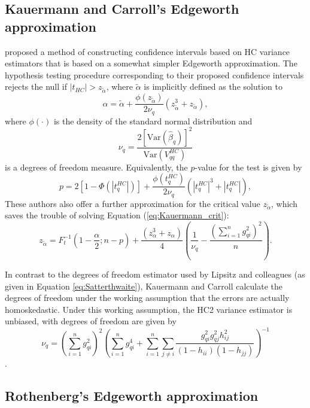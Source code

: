 \documentclass[12pt]{article}\usepackage[]{graphicx}\usepackage[]{color}
\newcommand{\Var}{\text{Var}}
\begin{document}
\subsection{Kauermann and Carroll's Edgeworth approximation}

\citet{Kauermann2001note} proposed a method of constructing confidence intervals based on HC variance estimators that is based on a somewhat simpler Edgeworth approximation. The hypothesis testing procedure corresponding to their proposed confidence intervals rejects the null if $\left|t_{HC} \right| > z_{\tilde\alpha}$, where $\tilde\alpha$ is implicitly defined as the solution to \begin{equation}
\label{eq:Kauermann_crit}
\alpha = \tilde\alpha + \frac{\phi\left(z_{\tilde\alpha}\right)}{2 \nu_q}\left(z_{\tilde\alpha}^3 + z_{\tilde\alpha}\right), 
\end{equation}
where $\phi(\cdot)$ is the density of the standard normal distribution and \[
\nu_q  = \frac{2 \left[\Var(\hat\beta_q)\right]^2}{\Var\left(V^{HC}_{qq}\right)}\] 
is a degrees of freedom measure. Equivalently, the $p$-value for the test is given by \[
p = 2 \left[1 - \Phi\left(|t^{HC}_q|\right)\right] + \frac{\phi\left(t^{HC}_q\right)}{2 \nu_q}\left(\left|t^{HC}_q\right|^3 + \left|t^{HC}_q\right|\right), \]
These authors also offer a further approximation for the critical value $z_{\tilde\alpha}$, which saves the trouble of solving Equation (\ref{eq:Kauermann_crit}):
\[
z_{\tilde\alpha} = F_t^{-1}\left(1 - \frac{\alpha}{2}; n - p\right) + \frac{\left(z_\alpha^3 + z_\alpha\right)}{4}\left(\frac{1}{\nu_q} - \frac{\left(\sum_{i=1}^n g_{qi}^2\right)^2}{n}\right). \]

In contrast to the degrees of freedom estimator used by Lipsitz and colleagues (as given in Equation \ref{eq:Satterthwaite}), Kauermann and Carroll calculate the degrees of freedom under the working assumption that the errors are actually homoskedastic. Under this working assumption, the HC2 variance estimator is unbiased, with degrees of freedom are given by \[
\nu_q = \left(\sum_{i=1}^n g_{qi}^2\right)^2\left(\sum_{i=1}^n g_{qi}^4 + \sum_{i=1}^n \sum_{j \neq i} \frac{g_{qi}^2 g_{qj}^2 h_{ij}^2}{(1 - h_{ii})(1 - h_{jj})}\right)^{-1} \].

\subsection{Rothenberg's Edgeworth approximation}
\end{document}
